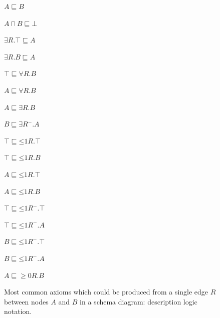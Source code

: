 \begin{figure}[tb]
\begin{center}
\begin{minipage}{.3\textwidth}
\begin{compactenum}
\item $A \sqsubseteq B$
\item $A\sqcap B\sqsubseteq \bot$
\item $\exists R.\top \sqsubseteq A$
\item $\exists R.B\sqsubseteq A$
\item $\top \sqsubseteq \forall R.B$ 
\item $A\sqsubseteq \forall R.B$
\end{compactenum}
\end{minipage}
\begin{minipage}{.3\textwidth}
\begin{compactenum}
\setcounter{enumi}{6}
\item $A\sqsubseteq \exists R.B$
\item $B\sqsubseteq \exists R^-.A$
\item $\top \sqsubseteq \mathord{\leq} 1 R.\top$ 
\item $\top \sqsubseteq \mathord{\leq} 1 R.B$
\item $A\sqsubseteq \mathord{\leq} 1 R.\top$
\item $A\sqsubseteq \mathord{\leq} 1 R.B$
\end{compactenum}
\end{minipage}
\begin{minipage}{.3\textwidth}
\begin{compactenum}
\setcounter{enumi}{12}
\item $\top \sqsubseteq \mathord{\leq} 1 R^-.\top$ 
\item $\top \sqsubseteq \mathord{\leq} 1 R^-.A$
\item $B \sqsubseteq \mathord{\leq} 1 R^-.\top$ 
\item $B \sqsubseteq \mathord{\leq} 1 R^-.A$
\item $A \sqsubseteq \mathord{\geq 0} R.B$
\end{compactenum}
\end{minipage}
\caption{Most common axioms which could be produced from a single edge $R$ between nodes $A$ and $B$ in a schema diagram: description logic notation.}\label{fig:generic-triple-axioms-DL}
\end{center}
\end{figure}

